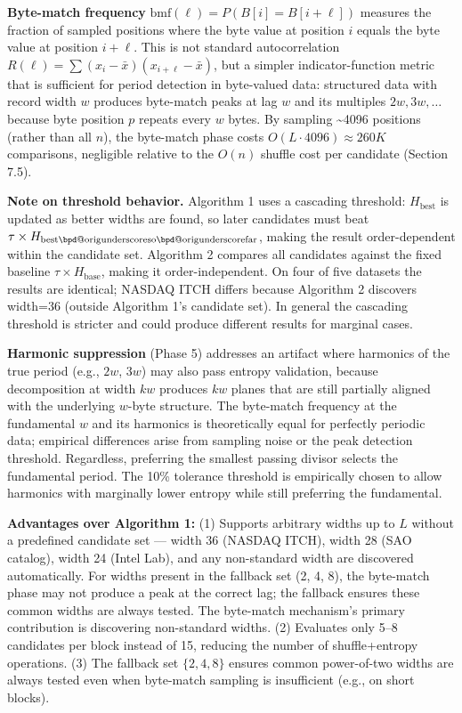 \documentclass[
  11pt,
  letterpaper,
]{article}
\makeatletter
\renewcommand{\_}{\bpd@origunderscore\allowbreak}
\makeatother
\begin{document}
\textbf{Byte-match frequency}
\(\text{bmf}(\ell) = P(B[i] = B[i + \ell])\) measures the fraction of
sampled positions where the byte value at position \(i\) equals the byte
value at position \(i + \ell\). This is not standard autocorrelation
\(R(\ell) = \sum (x_i - \bar{x})(x_{i+\ell} - \bar{x})\), but a simpler
indicator-function metric that is sufficient for period detection in
byte-valued data: structured data with record width \(w\) produces
byte-match peaks at lag \(w\) and its multiples \(2w, 3w, \ldots\)
because byte position \(p\) repeats every \(w\) bytes. By sampling
\textasciitilde4096 positions (rather than all \(n\)), the byte-match
phase costs \(O(L \cdot 4096) \approx 260K\) comparisons, negligible
relative to the \(O(n)\) shuffle cost per candidate (Section 7.5).

\textbf{Note on threshold behavior.} Algorithm 1 uses a cascading
threshold: \(H_{\text{best}}\) is updated as better widths are found, so
later candidates must beat \(\tau \times H_{\text{best\_so\_far}}\),
making the result order-dependent within the candidate set. Algorithm 2
compares all candidates against the fixed baseline
\(\tau \times H_{\text{base}}\), making it order-independent. On four of
five datasets the results are identical; NAS\-DAQ ITCH differs because
Algorithm 2 discovers width=36 (outside Algorithm 1's candidate set). In
general the cascading threshold is stricter and could produce different
results for marginal cases.

\textbf{Harmonic suppression} (Phase 5) addresses an artifact where
harmonics of the true period (e.g., \(2w\), \(3w\)) may also pass
entropy validation, because decomposition at width \(kw\) produces
\(kw\) planes that are still partially aligned with the underlying
\(w\)-byte structure. The byte-match frequency at the fundamental \(w\)
and its harmonics is theoretically equal for perfectly periodic data;
empirical differences arise from sampling noise or the peak detection
threshold. Regardless, preferring the smallest passing divisor selects
the fundamental period. The 10\% tolerance threshold is empirically
chosen to allow harmonics with marginally lower entropy while still
preferring the fundamental.

\textbf{Advantages over Algorithm 1:} (1) Supports arbitrary widths up
to \(L\) without a predefined candidate set --- width 36 (NAS\-DAQ ITCH),
width 28 (SAO catalog), width 24 (Intel Lab), and any non-standard width
are discovered automatically. For widths present in the fallback set (2,
4, 8), the byte-match phase may not produce a peak at the correct lag;
the fallback ensures these common widths are always tested. The
byte-match mechanism's primary contribution is discovering non-standard
widths. (2) Evaluates only 5--8 candidates per block instead of 15,
reducing the number of shuffle+entropy operations. (3) The fallback set
\(\{2, 4, 8\}\) ensures common power-of-two widths are always tested
even when byte-match sampling is insufficient (e.g., on short blocks).
\end{document}
